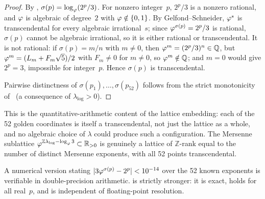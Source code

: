 \begin{proof}
By , $\sigma(p)=\log_{\varphi}(2^{p}/3)$.  For nonzero
integer~$p$, $2^{p}/3$ is a nonzero rational, and $\varphi$ is algebraic of
degree~$2$ with $\varphi\notin\{0,1\}$.  By Gelfond--Schneider,
$\varphi^{s}$ is transcendental for every algebraic irrational~$s$; since
$\varphi^{\sigma(p)}=2^{p}/3$ is rational, $\sigma(p)$ cannot be algebraic
irrational, so it is either rational or transcendental.  It is not
rational: if $\sigma(p)=m/n$ with $m\neq 0$, then
$\varphi^{m}=(2^{p}/3)^{n}\in\mathbb{Q}$, but
$\varphi^{m}=(L_{m}+F_{m}\sqrt5)/2$ with $F_{m}\neq 0$ for $m\neq 0$, so
$\varphi^{m}\notin\mathbb{Q}$; and $m=0$ would give $2^{p}=3$, impossible
for integer~$p$.  Hence $\sigma(p)$ is transcendental.

Pairwise distinctness of $\sigma(p_{1}),\ldots,\sigma(p_{52})$ follows
from the strict monotonicity of~ (a consequence of
$\lambda_{\log}>0$).
\end{proof}

This is the quantitative-arithmetic content of the lattice embedding:
each of the 52 golden coordinates is itself a transcendental, not just
the lattice as a whole, and no algebraic choice of $\lambda$ could
produce such a configuration.  The Mersenne sublattice
$\varphi^{\mathbb{Z}\lambda_{\log}-\log_{\varphi}3}\subset\mathbb{R}_{>0}$
is genuinely a lattice of $\mathbb{Z}$-rank equal to the number of
distinct Mersenne exponents, with all 52 points transcendental.

\begin{Remark}
A numerical version stating $|3\varphi^{\sigma(p)}-2^{p}|<10^{-14}$ over
the 52 known exponents is verifiable in double-precision arithmetic.
 is strictly stronger: it is exact, holds for all
real~$p$, and is independent of floating-point resolution.
\end{Remark}

